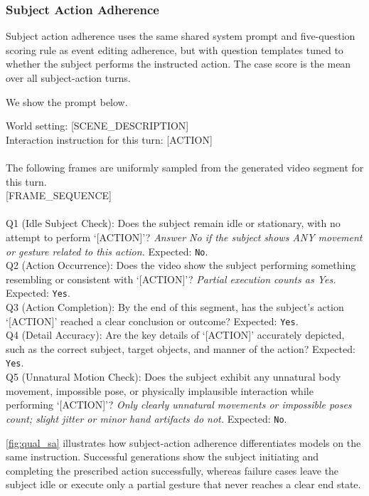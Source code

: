 \subsubsection{Subject Action Adherence}
\label{app:subject_action_detail}

Subject action adherence uses the same shared system prompt and five-question scoring rule as event editing adherence, but with question templates tuned to whether the subject performs the instructed action. The case score is the mean over all subject-action turns.

 We show the prompt below.

\begin{tcolorbox}[d3box, title={Subject Action Adherence (Q1--Q5)}]
\ttfamily\scriptsize
World setting: [SCENE\_DESCRIPTION]\\
Interaction instruction for this turn: [ACTION]\\
\\
The following frames are uniformly sampled from the generated video segment for this turn.\\
\mbox{[FRAME\_SEQUENCE]}\\
\\
Q1 (Idle Subject Check): Does the subject remain idle or stationary, with no attempt to perform `[ACTION]'? \emph{Answer No if the subject shows ANY movement or gesture related to this action.} Expected: \texttt{No}.\\
Q2 (Action Occurrence): Does the video show the subject performing something resembling or consistent with `[ACTION]'? \emph{Partial execution counts as Yes.} Expected: \texttt{Yes}.\\
Q3 (Action Completion): By the end of this segment, has the subject's action `[ACTION]' reached a clear conclusion or outcome? Expected: \texttt{Yes}.\\
Q4 (Detail Accuracy): Are the key details of `[ACTION]' accurately depicted, such as the correct subject, target objects, and manner of the action? Expected: \texttt{Yes}.\\
Q5 (Unnatural Motion Check): Does the subject exhibit any unnatural body movement, impossible pose, or physically implausible interaction while performing `[ACTION]'? \emph{Only clearly unnatural movements or impossible poses count; slight jitter or minor hand artifacts do not.} Expected: \texttt{No}.
\end{tcolorbox}

\cref{fig:qual_sa} illustrates how subject-action adherence differentiates models on the same instruction. Successful generations show the subject initiating and completing the prescribed action successfully, whereas failure cases leave the subject idle or execute only a partial gesture that never reaches a clear end state.

